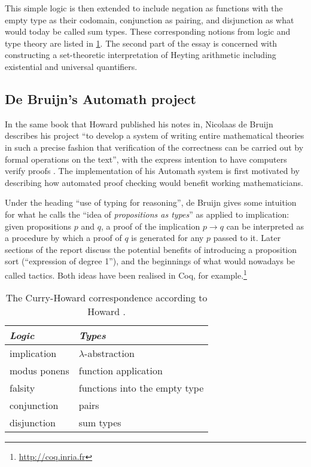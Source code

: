 \documentclass[12pt,toc=bibliography,numbers=noendperiod,
               footnotes=multiple,twoside]{scrartcl}
\begin{document}
This simple
logic is then extended to include negation as functions with the empty type as their codomain, conjunction as pairing, and disjunction as what would today be called sum types. These corresponding notions from logic and type theory are listed in \cref{tab:howard}. The second part of the essay is concerned with constructing a set-theoretic interpretation of Heyting arithmetic including existential and universal quantifiers.

\subsection{De Bruijn's Automath project}

In the same book that Howard published his notes in, Nicolaas de Bruijn describes his project \enquote{to develop a system of writing entire mathematical theories in such a precise fashion that verification of the correctness can be carried out by formal operations on the text}, with the express intention to have computers verify proofs \autocite{de_bruijn_survey_1980}. The implementation of his Automath system is first motivated by describing how automated proof checking would benefit working mathematicians.

Under the heading \enquote{use of typing for reasoning}, de Bruijn gives some intuition for what he calls the \enquote{idea of \emph{propositions as types}} as applied to implication: given propositions \(p\) and \(q\), a proof of the implication \(p \rightarrow q\) can be interpreted as a procedure by which a proof of \(q\) is generated for any \(p\) passed to it. Later sections of the report discuss the potential benefits of introducing a proposition sort (\enquote{expression of degree 1}), and the beginnings of what would nowadays be called tactics. Both ideas have been realised in Coq, for example.\footnote{\url{http://coq.inria.fr}}

\begin{table}[h]
    \centering
    \begin{tabular}{l l}
        \toprule
        \textit{Logic} & \textit{Types} \\
        \midrule
	implication & \(\lambda\)-abstraction \\
	modus ponens & function application \\
	falsity & functions into the empty type \\
	conjunction & pairs \\
	disjunction & sum types \\
        \bottomrule
    \end{tabular}
    \caption{The Curry-Howard correspondence according to Howard \parencite{howard_formulae-as-types_1980}.}
    \label{tab:howard}
\end{table}
\end{document}
